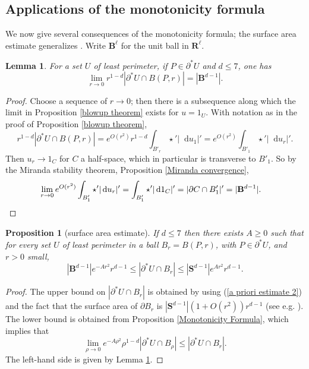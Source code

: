\documentclass[reqno,12pt,letterpaper]{amsart}
\newcommand{\RR}{\mathbf{R}}
\newcommand{\Sph}{\mathbf S}
\newcommand{\Ball}{\mathbf{B}}
\newcommand*\dif{\mathop{}\!\mathrm{d}}
\newtheorem{lemma}[theorem]{Lemma}
\newtheorem{proposition}[theorem]{Proposition}
\theoremstyle{definition}
\numberwithin{equation}{section}
\begin{document}
\subsection{Applications of the monotonicity formula}
We now give several consequences of the monotonicity formula; the surface area estimate generalizes \cite[Remark 5.13]{Giusti77}.
Write $\Ball^\ell$ for the unit ball in $\RR^\ell$.

\begin{lemma}\label{least perimeter minimal size}
For a set $U$ of least perimeter, if $P \in \partial^* U$ and $d \leq 7$, one has
$$\lim_{r \to 0} r^{1 - d} |\partial^* U \cap B(P, r)| = |\Ball^{d - 1}|.$$
\end{lemma}
\begin{proof}
Choose a sequence of $r \to 0$; then there is a subsequence along which the limit in Proposition \ref{blowup theorem} exists for $u = 1_U$.
With notation as in the proof of Proposition \ref{blowup theorem},
$$r^{1 - d} |\partial^* U \cap B(P, r)| = e^{O(r^2)} r^{1 - d}\int_{B'_r} \star'|\dif u_1|' = e^{O(r^2)} \int_{B'_1} \star'|\dif u_r|'.$$
Then $u_r \to 1_C$ for $C$ a half-space, which in particular is transverse to $B'_1$.
So by the Miranda stability theorem, Proposition \ref{Miranda convergence},
\begin{align*}
\lim_{r \to 0} e^{O(r^2)} \int_{B'_1} \star'|\dif u_r|' &= \int_{B'_1} \star'|\dif 1_C|' = |\partial C \cap B'_1|' = |\Ball^{d - 1}|. \qedhere
\end{align*}
\end{proof}

\begin{proposition}[surface area estimate]\label{doubling dimension}
If $d \leq 7$ then there exists $A \geq 0$ such that for every set $U$ of least perimeter in a ball $B_r = B(P, r)$, with $P \in \partial^* U$, and $r > 0$ small,
$$|\Ball^{d - 1}|e^{-Ar^2}r^{d - 1} \leq |\partial^*U \cap B_r| \leq |\Sph^{d - 1}|e^{Ar^2} r^{d - 1}.$$
\end{proposition}
\begin{proof}
The upper bound on $|\partial^* U \cap B_r|$ is obtained by using (\ref{a priori estimate 2}) and the fact that the surface area of $\partial B_r$ is $|\Sph^{d - 1}|(1 + O(r^2))r^{d - 1}$ (see e.g. \cite{gray1974volume}).
The lower bound is obtained from Proposition \ref{Monotonicity Formula}, which implies that
$$\lim_{\rho \to 0} e^{-A\rho^2} \rho^{1 - d} |\partial^* U \cap B_\rho| \leq |\partial^* U \cap B_r|.$$
The left-hand side is given by Lemma \ref{least perimeter minimal size}.
\end{proof}
\end{document}
